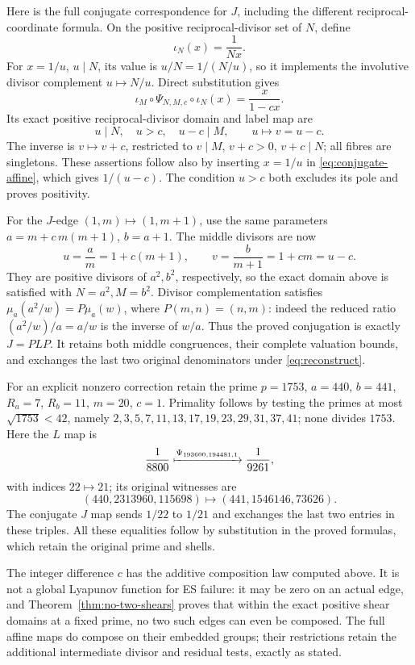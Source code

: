 \documentclass[11pt]{article}
\theoremstyle{definition}\newtheorem{definition}[theorem]{Definition}
\theoremstyle{remark}\newtheorem{remark}[theorem]{Remark}
\begin{document}
Here is the full conjugate correspondence for \(J\),
including the different reciprocal-coordinate formula.
On the positive reciprocal-divisor set of \(N\), define
\[
 \iota_N(x)=\frac1{Nx}.
\]
For \(x=1/u\), \(u\mid N\), its value is
\(u/N=1/(N/u)\), so it implements the involutive divisor
complement \(u\mapsto N/u\).  Direct substitution gives
\begin{equation}\label{eq:conjugate-affine}
 \iota_M\circ\Psi_{N,M,c}\circ\iota_N(x)
       =\frac{x}{1-cx}.
\end{equation}
Its exact positive reciprocal-divisor domain and label map are
\[
 u\mid N,\quad u>c,\quad u-c\mid M,
 \qquad u\longmapsto v=u-c.
\]
The inverse is \(v\mapsto v+c\), restricted to
\(v\mid M\), \(v+c>0\), \(v+c\mid N\);
all fibres are singletons.  These assertions follow
also by inserting \(x=1/u\) in \eqref{eq:conjugate-affine},
which gives \(1/(u-c)\).  The condition \(u>c\)
both excludes its pole and proves positivity.

For the \(J\)-edge \((1,m)\mapsto(1,m+1)\), use the same
parameters \(a=m+c\,m(m+1)\), \(b=a+1\).
The middle divisors are now
\[
 u=\frac am=1+c(m+1),\qquad
 v=\frac b{m+1}=1+cm=u-c.
\]
They are positive divisors of \(a^2,b^2\), respectively,
so the exact domain above is satisfied with \(N=a^2,M=b^2\).
Divisor complementation satisfies
\(\mu_a(a^2/w)=P\mu_a(w)\), where
\(P(m,n)=(n,m)\): indeed the reduced ratio
\((a^2/w)/a=a/w\) is the inverse of \(w/a\).
Thus the proved conjugation is exactly \(J=PLP\).
It retains both middle congruences, their complete
valuation bounds, and exchanges the last two original
denominators under \eqref{eq:reconstruct}.

For an explicit nonzero correction retain the prime
\(p=1753\), \(a=440\), \(b=441\), \(R_a=7\),
\(R_b=11\), \(m=20\), \(c=1\).  Primality follows
by testing the primes at most \(\sqrt{1753}<42\),
namely \(2,3,5,7,11,13,17,19,23,29,31,37,41\);
none divides \(1753\).  Here the \(L\) map is
\[
 \frac1{8800}\xmapsto{\Psi_{193600,194481,1}}
 \frac1{9261},
\]
with indices \(22\mapsto21\); its original witnesses are
\[
 (440,2313960,115698)\longmapsto
 (441,1546146,73626).
\]
The conjugate \(J\) map sends \(1/22\) to \(1/21\)
and exchanges the last two entries in these triples.
All these equalities follow by substitution in the
proved formulas, which retain the original prime and shells.

The integer difference \(c\) has the additive
composition law computed above.  It is not a
global Lyapunov function for ES failure: it may
be zero on an actual edge, and
Theorem~\ref{thm:no-two-shears} proves that within
the exact positive shear domains at a fixed
prime, no two such edges can even be composed.
The full affine maps do compose on their
embedded groups; their restrictions retain
the additional intermediate divisor and
residual tests, exactly as stated.
\end{document}
